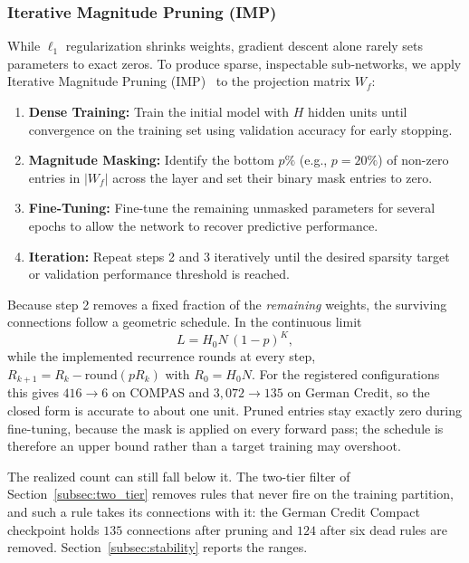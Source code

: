 \subsubsection{Iterative Magnitude Pruning (IMP)}
While $\ell_1$ regularization shrinks weights, gradient descent alone rarely sets parameters to exact zeros. To produce sparse, inspectable sub-networks, we apply Iterative Magnitude Pruning (IMP)~\cite{frankle2018lottery,han2015learning} to the projection matrix $W_f$:
\begin{enumerate}
    \item \textbf{Dense Training:} Train the initial model with $H$ hidden units until convergence on the training set using validation accuracy for early stopping.
    \item \textbf{Magnitude Masking:} Identify the bottom $p\%$ (e.g., $p = 20\%$) of non-zero entries in $|W_f|$ across the layer and set their binary mask entries to zero.
    \item \textbf{Fine-Tuning:} Fine-tune the remaining unmasked parameters for several epochs to allow the network to recover predictive performance.
    \item \textbf{Iteration:} Repeat steps 2 and 3 iteratively until the desired sparsity target or validation performance threshold is reached.
\end{enumerate}

Because step 2 removes a fixed fraction of the \emph{remaining} weights, the surviving connections follow a geometric schedule. In the continuous limit
\begin{equation}
\label{eq:link_budget}
L = H_0 N \,(1-p)^{K},
\end{equation}
while the implemented recurrence rounds at every step, $R_{k+1} = R_k - \mathrm{round}(p R_k)$ with $R_0 = H_0N$. For the registered configurations this gives $416 \rightarrow 6$ on COMPAS and $3{,}072 \rightarrow 135$ on German Credit, so the closed form is accurate to about one unit. Pruned entries stay exactly zero during fine-tuning, because the mask is applied on every forward pass; the schedule is therefore an upper bound rather than a target training may overshoot.

The realized count can still fall below it. The two-tier filter of Section~\ref{subsec:two_tier} removes rules that never fire on the training partition, and such a rule takes its connections with it: the German Credit Compact checkpoint holds $135$ connections after pruning and $124$ after six dead rules are removed. Section~\ref{subsec:stability} reports the ranges.

